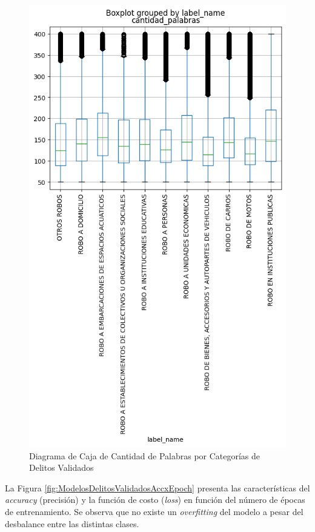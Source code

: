 \documentclass[onecolumn, journal, english, 12pt, a4paper]{IEEEtran} %
\theoremstyle{definition}
\begin{document}
\begin{figure}[h!]
    \centering
    \includegraphics[scale=.8]{imgs/cantidadPalabrasTrainDelitosValidadosBoxPlot.png}
    \caption{Diagrama de Caja de Cantidad de Palabras por Categorías de Delitos Validados}
    \label{fig:diagramaCajaRelatoTrainValidados}
\end{figure}

La Figura \ref{fig:ModelosDelitosValidadosAccxEpoch} presenta las
características del \emph{accuracy} (precisión) y la función de costo
(\emph{loss}) en función del número de épocas de entrenamiento. Se
observa que no existe un \emph{overfitting} del modelo a pesar del
desbalance entre las distintas clases.
\end{document}
